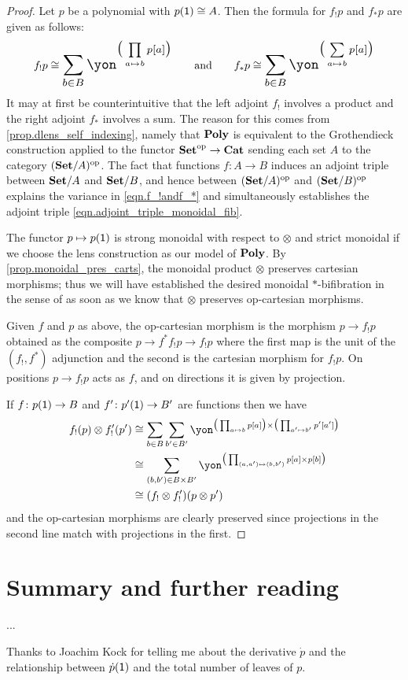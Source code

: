 \documentclass[DynamicalBook]{subfiles}
\begin{document}
\begin{proof}
Let $p$ be a polynomial with $p(\textsf{1})\cong A$. Then the formula for $f_!p$ and $f_*p$ are given as follows:
\begin{equation}\label{eqn.f_!andf_*}
f_!p\cong\scalebox{1.3}{$\displaystyle\sum_{b\in B}\yon^{\big(\prod\limits_{a\mapsto b}p[a]\big)}$}
\qqand
f_*p\cong\scalebox{1.3}{$\displaystyle\sum_{b\in B}\yon^{\big(\sum\limits_{a\mapsto b}p[a]\big)}$}
\end{equation}
It may at first be counterintuitive that the left adjoint $f_!$ involves a product and the right adjoint $f_*$ involves a sum. The reason for this comes from \cref{prop.dlens_self_indexing}, namely that $\textbf{Poly}$ is equivalent to the Grothendieck construction applied to the functor $\textbf{Set}^{\textnormal{op}}\to\textbf{Cat}$ sending each set $A$ to the category $(\textbf{Set}/A)^{\textnormal{op}}$. The fact that functions $f\colon A\to B$ induces an adjoint triple between $\textbf{Set}/A$ and $\textbf{Set}/B$, and hence between $(\textbf{Set}/A)^{\textnormal{op}}$ and $(\textbf{Set}/B)^{\textnormal{op}}$ explains the variance in \eqref{eqn.f_!andf_*} and simultaneously establishes the adjoint triple \eqref{eqn.adjoint_triple_monoidal_fib}.

The functor $p\mapsto p(\textsf{1})$ is strong monoidal with respect to $\otimes$ and strict monoidal if we choose the lens construction as our model of $\textbf{Poly}$. By \cref{prop.monoidal_pres_carts}, the monoidal product $\otimes$ preserves cartesian morphisms; thus we will have established the desired monoidal $*$-bifibration in the sense of \cite[Definition 12.1]{shulman2008framed} as soon as we know that $\otimes$ preserves op-cartesian morphisms.

Given $f$ and $p$ as above, the op-cartesian morphism is the morphism $p\to f_!p$ obtained as the composite $p\to f^*f_!p\to f_!p$ where the first map is the unit of the $(f_!,f^*)$ adjunction and the second is the cartesian morphism for $f_!p$. On positions $p\to f_!p$ acts as $f$, and on directions it is given by projection. 

If $f\colon p(\textsf{1})\to B$ and $f'\colon p'(\textsf{1})\to B'$ are functions then we have
\begin{align*}
	f_!(p)\otimes f'_!(p')&\cong
	\sum_{b\in B}\sum_{b'\in B'}\yon^{\big(\prod_{a\mapsto b}p[a]\big)\times\big(\prod_{a'\mapsto b'}p'[a']\big)}\\&\cong
	\sum_{(b,b')\in B\times B'}\yon^{\big(\prod_{(a,a')\mapsto(b,b')}p[a]\times p[b]\big)}\\&
	\cong (f_!\otimes f'_!)(p\otimes p')
\end{align*}
and the op-cartesian morphisms are clearly preserved since projections in the second line match with projections in the first.
\end{proof}

\section{Summary and further reading}

...

Thanks to Joachim Kock for telling me about the derivative $\dot{p}$ and the relationship between $\dot{p}(\textsf{1})$ and the total number of leaves of $p$.
\end{document}
